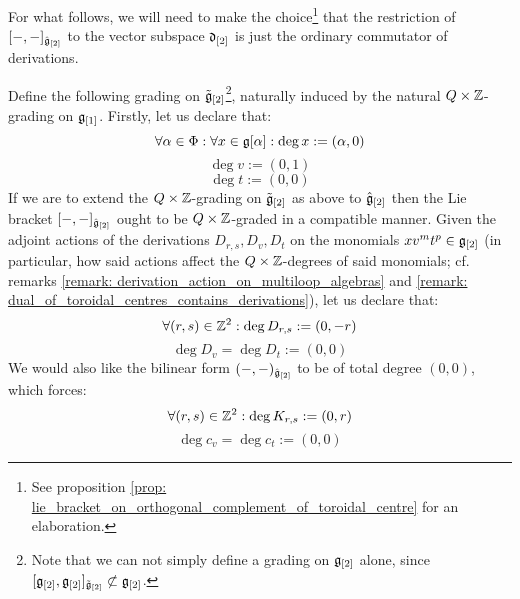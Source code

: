         \begin{proposition} \label{prop: root_grading_on_extended_toroidal_lie_algebras}
            For what follows, we will need to make the choice\footnote{See proposition \ref{prop: lie_bracket_on_orthogonal_complement_of_toroidal_centre} for an elaboration.} that the restriction of $[-, -]_{\hat{\mathfrak{g}}_{[2]}}$ to the vector subspace $\mathfrak{d}_{[2]}$ is just the ordinary commutator of derivations.
        
            Define the following grading on $\tilde{\mathfrak{g}}_{[2]}$\footnote{Note that we can not simply define a grading on $\mathfrak{g}_{[2]}$ alone, since $[\mathfrak{g}_{[2]}, \mathfrak{g}_{[2]}]_{\tilde{\mathfrak{g}}_{[2]}} \not \subset \mathfrak{g}_{[2]}$.}, naturally induced by the natural $Q \x \Z$-grading on $\mathfrak{g}_{[1]}$. Firstly, let us declare that:
                $$\forall \alpha \in \Phi: \forall x \in \mathfrak{g}[\alpha]: \deg x := (\alpha, 0)$$
                $$\deg v := (0, 1)$$
                $$\deg t := (0, 0)$$
            If we are to extend the $Q \x \Z$-grading on $\tilde{\mathfrak{g}}_{[2]}$ as above to $\hat{\mathfrak{g}}_{[2]}$ then the Lie bracket $[-, -]_{\hat{\mathfrak{g}}_{[2]}}$ ought to be $Q \x \Z$-graded in a compatible manner. Given the adjoint actions of the derivations $D_{r, s}, D_v, D_t$ on the monomials $x v^m t^p \in \mathfrak{g}_{[2]}$ (in particular, how said actions affect the $Q \x \Z$-degrees of said monomials; cf. remarks \ref{remark: derivation_action_on_multiloop_algebras} and \ref{remark: dual_of_toroidal_centres_contains_derivations}), let us declare that:
                $$\forall (r, s) \in \mathbb{Z}^2: \deg D_{r, s} := (0, -r)$$
                $$\deg D_v = \deg D_t := (0, 0)$$
            We would also like the bilinear form $(-, -)_{\hat{\mathfrak{g}}_{[2]}}$ to be of total degree $(0, 0)$, which forces:
                $$\forall (r, s) \in \mathbb{Z}^2: \deg K_{r, s} := (0, r)$$
                $$\deg c_v = \deg c_t := (0, 0)$$
        \end{proposition}
